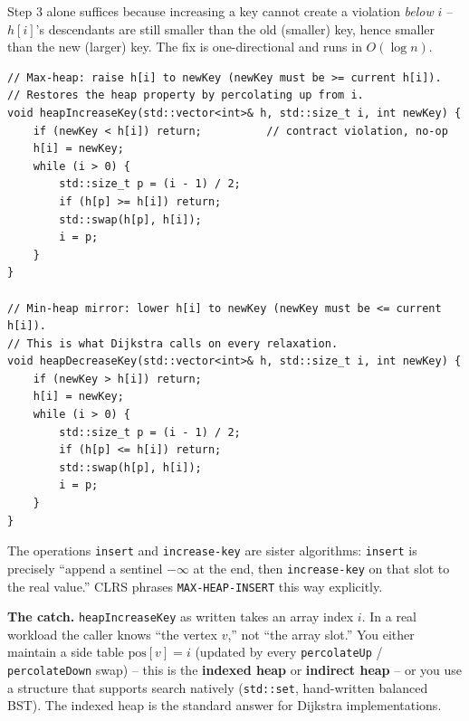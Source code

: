 \documentclass[11pt]{article}
\begin{document}
Step 3 alone suffices because increasing a key cannot create a
violation \emph{below} $i$ -- $h[i]$'s descendants are still smaller
than the old (smaller) key, hence smaller than the new (larger)
key. The fix is one-directional and runs in $O(\log n)$.

\begin{lstlisting}
// Max-heap: raise h[i] to newKey (newKey must be >= current h[i]).
// Restores the heap property by percolating up from i.
void heapIncreaseKey(std::vector<int>& h, std::size_t i, int newKey) {
    if (newKey < h[i]) return;          // contract violation, no-op
    h[i] = newKey;
    while (i > 0) {
        std::size_t p = (i - 1) / 2;
        if (h[p] >= h[i]) return;
        std::swap(h[p], h[i]);
        i = p;
    }
}

// Min-heap mirror: lower h[i] to newKey (newKey must be <= current h[i]).
// This is what Dijkstra calls on every relaxation.
void heapDecreaseKey(std::vector<int>& h, std::size_t i, int newKey) {
    if (newKey > h[i]) return;
    h[i] = newKey;
    while (i > 0) {
        std::size_t p = (i - 1) / 2;
        if (h[p] <= h[i]) return;
        std::swap(h[p], h[i]);
        i = p;
    }
}
\end{lstlisting}

The operations \texttt{insert} and \texttt{increase-key} are sister
algorithms: \texttt{insert} is precisely ``append a sentinel
$-\infty$ at the end, then \texttt{increase-key} on that slot to the
real value.'' CLRS phrases \texttt{MAX-HEAP-INSERT} this way
explicitly.

\textbf{The catch.} \texttt{heapIncreaseKey} as written takes an
array index $i$. In a real workload the caller knows ``the vertex
$v$,'' not ``the array slot.'' You either maintain a side table
$\text{pos}[v] = i$ (updated by every \texttt{percolateUp} /
\texttt{percolateDown} swap) -- this is the \textbf{indexed heap} or
\textbf{indirect heap} -- or you use a structure that supports
search natively (\texttt{std::set}, hand-written balanced BST). The
indexed heap is the standard answer for Dijkstra implementations.
\end{document}
